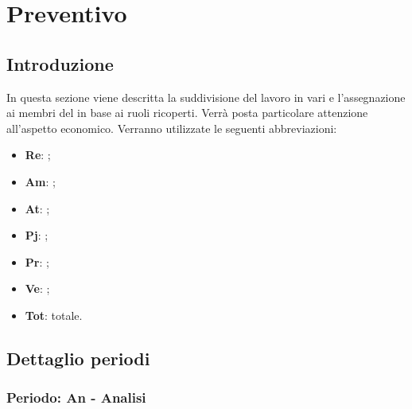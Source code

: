 \section {Preventivo}
	\subsection {Introduzione}
    In questa sezione viene descritta la suddivisione del lavoro in vari  e l'assegnazione ai membri del  in base ai ruoli ricoperti. Verrà posta particolare attenzione all'aspetto economico.
    Verranno utilizzate le seguenti abbreviazioni:
   		\begin{itemize}
   		\item{\textbf{Re}}: \responsabilediprogetto;
     	\item{\textbf{Am}}: \amministratore;
     	\item{\textbf{At}}: \analista;
     	\item{\textbf{Pj}}: \progettista;
     	\item{\textbf{Pr}}: \programmatore;
     	\item{\textbf{Ve}}: \verificatore;
     	\item{\textbf{Tot}}: totale.
   		\end{itemize}

\newpage
	\subsection {Dettaglio periodi}
		\subsubsection {Periodo: An - Analisi}

